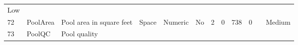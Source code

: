 \documentclass[11pt]{article}
\begin{document}
\begin{longtable}[]{@{}llllllllllll@{}}
\begin{minipage}[t]{0.04\columnwidth}
Low\strut
\end{minipage}\tabularnewline
\begin{minipage}[t]{0.04\columnwidth}\raggedright\strut
72\strut
\end{minipage} & \begin{minipage}[t]{0.04\columnwidth}\raggedright\strut
PoolArea\strut
\end{minipage} & \begin{minipage}[t]{0.04\columnwidth}\raggedright\strut
Pool area in square feet\strut
\end{minipage} & \begin{minipage}[t]{0.04\columnwidth}\raggedright\strut
Space\strut
\end{minipage} & \begin{minipage}[t]{0.04\columnwidth}\raggedright\strut
Numeric\strut
\end{minipage} & \begin{minipage}[t]{0.04\columnwidth}\raggedright\strut
No\strut
\end{minipage} & \begin{minipage}[t]{0.04\columnwidth}\raggedright\strut
2\strut
\end{minipage} & \begin{minipage}[t]{0.04\columnwidth}\raggedright\strut
0\strut
\end{minipage} & \begin{minipage}[t]{0.04\columnwidth}\raggedright\strut
738\strut
\end{minipage} & \begin{minipage}[t]{0.04\columnwidth}\raggedright\strut
0\strut
\end{minipage} & \begin{minipage}[t]{0.04\columnwidth}\raggedright\strut
\strut
\end{minipage} & \begin{minipage}[t]{0.04\columnwidth}\raggedright\strut
Medium\strut
\end{minipage}\tabularnewline
\begin{minipage}[t]{0.04\columnwidth}\raggedright\strut
73\strut
\end{minipage} & \begin{minipage}[t]{0.04\columnwidth}\raggedright\strut
PoolQC\strut
\end{minipage} & \begin{minipage}[t]{0.04\columnwidth}\raggedright\strut
Pool quality\strut
\end{minipage} & \begin{minipage}[t]{0.04\columnwidth}\raggedright\strut

\end{minipage}
\end{longtable}
\end{document}
